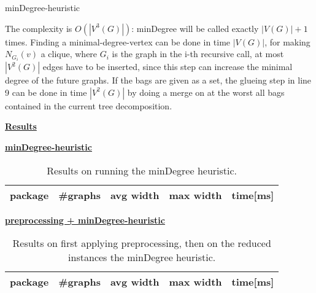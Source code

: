 \documentclass[a4wide]{article}
\begin{document}
\begin{algorithm}
\caption{minDegree-heuristic}
\begin{algorithmic}[1]
\State {}
\EndIf
\EndProcedure
\end{algorithmic}
\end{algorithm}

\vspace*{5mm}

The complexity is $O(|V^{3}(G)|)$: minDegree will be called exactly $|V(G)|+1$ times. Finding a minimal-degree-vertex can be done in time $|V(G)|$, for making $N_{G_{i}}(v)$ a clique, where $G_{i}$ is the graph in the i-th recursive call, at most $|V^{2}(G)|$ edges have to be inserted, since this step can increase the minimal degree of the future graphs. If the bags are given as a set, the glueing step in line 9 can be done in time $|V^{2}(G)|$ by doing a merge on at the worst all bags contained in the current tree decomposition. \\

\newpage

\underline{\textbf{Results}} \\

\begin{table}[h!]
\underline{\textbf{minDegree-heuristic}} \\
\begin{tabular}{|l|l|l|l|l|}
\hline
package & \#graphs & avg width & max width & time[ms] \\
\hline
\hline

\hline
\end{tabular}
\caption{\small{Results on running the minDegree heuristic.} }
\end{table}

\begin{table}[h!]
\underline{\textbf{preprocessing + minDegree-heuristic}} \\
\begin{tabular}{|l|l|l|l|l|}
\hline
package & \#graphs & avg width & max width & time[ms] \\
\hline
\hline

\hline
\end{tabular}
\caption{\small{Results on first applying preprocessing, then on the reduced instances the minDegree heuristic.}}
\end{table}
\end{document}
